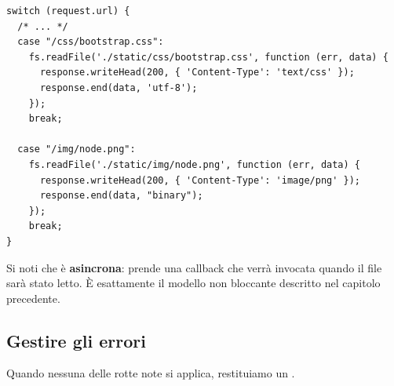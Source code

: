\begin{affianco}[0.6][c]
\codicepiccolo
\begin{lstlisting}[style=js, name=router.js]
switch (request.url) {
  /* ... */
  case "/css/bootstrap.css":
    fs.readFile('./static/css/bootstrap.css', function (err, data) {
      response.writeHead(200, { 'Content-Type': 'text/css' });
      response.end(data, 'utf-8');
    });
    break;

  case "/img/node.png":
    fs.readFile('./static/img/node.png', function (err, data) {
      response.writeHead(200, { 'Content-Type': 'image/png' });
      response.end(data, "binary");
    });
    break;
}
\end{lstlisting}
\risultato
\begin{immagine}
\end{immagine}
\end{affianco}

Si noti che  è \textbf{asincrona}: prende una callback che
verrà invocata quando il file sarà stato letto. È esattamente il modello non
bloccante descritto nel capitolo precedente.

\subsection{Gestire gli errori}

Quando nessuna delle rotte note si applica, restituiamo un .


